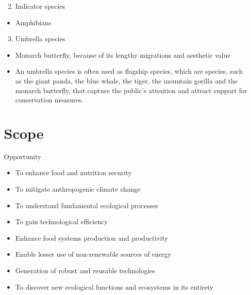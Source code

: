\documentclass[
  ignorenonframetext,
  aspectratio=169]{beamer}
\providecommand{\tightlist}{%
  \setlength{\itemsep}{0pt}\setlength{\parskip}{0pt}}
\begin{document}
\begin{frame}{}
\protect\hypertarget{section-16}{}
\begin{enumerate}
\setcounter{enumi}{1}
\tightlist
\item
  Indicator species
\end{enumerate}

\begin{itemize}
\tightlist
\item
  Amphibians
\end{itemize}

\begin{enumerate}
\setcounter{enumi}{2}
\tightlist
\item
  Umbrella species
\end{enumerate}

\begin{itemize}
\tightlist
\item
  Monarch butterfly, because of its lengthy migrations and aesthetic
  value
\item
  An umbrella species is often used as flagship species, which are
  species, such as the giant panda, the blue whale, the tiger, the
  mountain gorilla and the monarch butterfly, that capture the public's
  attention and attract support for conservation measures.
\end{itemize}
\end{frame}

\hypertarget{scope}{%
\section{Scope}\label{scope}}

\begin{frame}{Opportunity}
\protect\hypertarget{opportunity}{}
\begin{itemize}
\tightlist
\item
  To enhance food and nutrition security
\item
  To mitigate anthropogenic climate change
\item
  To understand fundamental ecological processes
\item
  To gain technological efficiency
\item
  Enhance food systems production and productivity
\item
  Enable lesser use of non-renewable sources of energy
\item
  Generation of robust and reusable technologies
\item
  To discover new ecological functions and ecosystems in its entirety
\end{itemize}
\end{frame}
\end{document}
